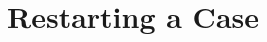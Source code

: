 \documentclass[a4paper,10pt]{report}
\begin{document}
%
%
%
%
%
%
%
\chapter{Restarting a Case}
\end{document}
